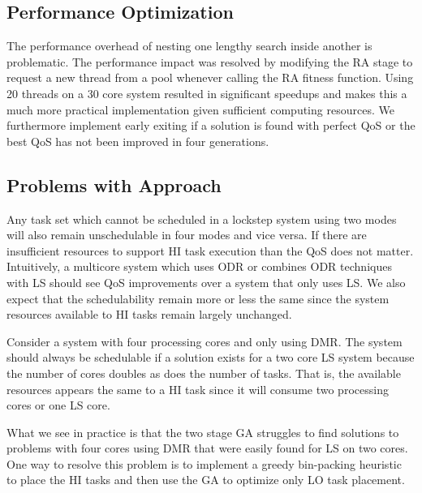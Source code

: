 	
\subsection{Performance Optimization}

The performance overhead of nesting one lengthy search inside another is problematic. The performance impact was resolved by modifying the RA stage to request a new thread from a pool whenever calling the RA fitness function. Using 20 threads on a 30 core system resulted in significant speedups and makes this a much more practical implementation given sufficient computing resources. We furthermore implement early exiting if a solution is found with perfect QoS or the best QoS has not been improved in four generations.

\subsection{Problems with Approach}

	Any task set which cannot be scheduled in a lockstep system using two modes will also remain unschedulable in four modes and vice versa. 
	If there are insufficient resources to support HI task execution than the QoS does not matter. 
	Intuitively, a multicore system which uses ODR or combines ODR techniques with LS should see QoS improvements over a system that only uses LS. 
	We also expect that the schedulability remain more or less the same since the system resources available to HI tasks remain largely unchanged.

	Consider a system with four processing cores and only using DMR. 
	The system should always be schedulable if a solution exists for a two core LS system because the number of cores doubles as does the number of tasks. 
	That is, the available resources appears the same to a HI task since it will consume two processing cores or one LS core.

	What we see in practice is that the two stage GA struggles to find solutions to problems with four cores using DMR that were easily found for LS on two cores.
	One way to resolve this problem is to implement a greedy bin-packing heuristic \cite{al2015enhanced} to place the HI tasks and then use the GA to optimize only LO task placement. 
	
	

%  

